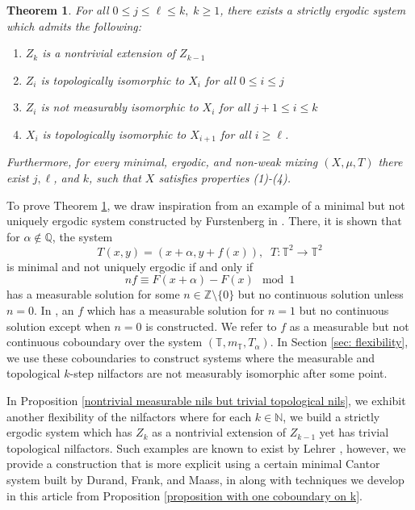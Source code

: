 \documentclass[12pt]{amsart}
\theoremstyle{definition}
\theoremstyle{plain}
\newtheorem{theorem}{Theorem}[section]
\theoremstyle{definition}
\numberwithin{equation}{section}
\begin{document}
 \begin{theorem}\label{the theorem in introduction}
For all $0 \leq j \leq \ell \leq k,\; k\geq 1$, there exists a strictly ergodic system which admits the following:
\begin{enumerate}
    \item $Z_k$ is a nontrivial extension of $Z_{k-1}$
    \item $Z_i$ is topologically isomorphic to $X_i$ for all $0 \leq i \leq j$
    \item $Z_i$ is not measurably isomorphic to $X_i$ for all $j+1 \leq i \leq k$
    \item $X_i$ is topologically isomorphic to $X_{i+1}$ for all $i \geq \ell$.

\end{enumerate}
Furthermore, for every minimal, ergodic, and non-weak mixing $(X,\mu,T)$ there exist $j,\ell$, and $k$, such that $X$ satisfies properties (1)-(4).
 \end{theorem}

To prove Theorem \ref{the theorem in introduction}, we draw inspiration from an example of a minimal but not uniquely ergodic system constructed by Furstenberg in \cite{Fur61}. There, it is shown that for $\alpha \notin \mathbb{Q}$, the system $$T(x,y)=(x+\alpha,y+f(x)), \;\;T\colon\mathbb{T}^{2} \rightarrow \mathbb{T}^{2}$$ is minimal and not uniquely ergodic if and only if 
\begin{equation}\label{eq: coboundary furstenberg}
nf \equiv F(x+\alpha)-F(x) \mod 1
\end{equation}
has a measurable solution for some $n \in \mathbb{Z} \setminus \{0\}$ but no continuous solution unless $n=0$. In \cite{Fur61}, an $f$ which has a measurable solution for $n=1$ but no continuous solution except when $n=0$ is constructed. We refer to $f$ as a measurable but not continuous coboundary over the system $(\mathbb{T},m_{\mathbb{T}},T_{\alpha})$. In Section \ref{sec: flexibility}, we use these coboundaries to construct systems where the measurable and topological $k$-step nilfactors are not measurably isomorphic after some point.

In Proposition \ref{nontrivial measurable nils but trivial topological nils}, we exhibit another flexibility of the nilfactors where for each $k\in \mathbb{N}$, we build a strictly ergodic system which has $Z_k$ as a nontrivial extension of $Z_{k-1}$ yet has trivial topological nilfactors. Such examples are known to exist by Lehrer \cite{Lehrer}, however, we provide a construction that is more explicit using a certain minimal Cantor system built by Durand, Frank, and Maass, in \cite{nontrivial Kronecker trivial MEF} along with techniques we develop in this article from Proposition \ref{proposition with one coboundary on k}.
 
\end{document}
